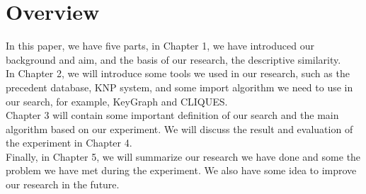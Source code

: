 \section{Overview}
In this paper, we have five parts, in Chapter 1, we have introduced our background and aim, and the basis of our research, the descriptive similarity.
\\
In Chapter 2, we will introduce some tools we used in our research, such as the precedent database, KNP system, and some import algorithm we need to use in our search, for example, KeyGraph and CLIQUES.
\\
Chapter 3 will contain some important definition of our search and the main algorithm based on our experiment. We will discuss the result and evaluation of the experiment in Chapter 4.
\\
Finally, in Chapter 5, we will summarize our research we have done and some the problem we have met during the experiment. We also have some idea to improve our research in the future.